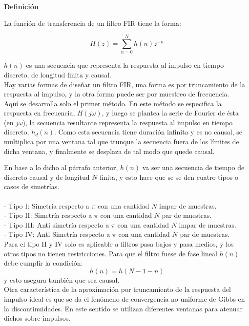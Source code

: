 \documentclass[informe.tex]{subfiles}
\begin{document}
\textbf{Definición}\newline

La función de transferencia de un filtro FIR tiene la forma:

$$
	H(z) = \sum_{n=0}^{N}{h(n)z^{-n}}
$$

$h(n)$ es una secuencia que representa la respuesta al impulso en tiempo discreto, de longitud finita y causal.\\

Hay varias formas de diseñar un filtro FIR, una forma es por truncamiento de la respuesta al impulso, y la otra forma puede ser por muestreo de frecuencia.\\

Aquí se desarrolla solo el primer método. En este método se especifica la respuesta en frecuencia, $H(j\omega)$, y luego se plantea la serie de Fourier de ésta (en $j\omega$), la secuencia resultante representa la respuesta al impulso en tiempo discreto, $h_d(n)$. Como esta secuencia tiene duración infinita y es no causal, se multiplica por una ventana tal que trunque la secuencia fuera de los límites de dicha ventana, y finalmente se desplaza de tal modo que quede causal.\newline

En base a lo dicho al párrafo anterior, $h(n)$ va ser una secuencia de tiempo de discreto causal y de longitud $N$ finita, y esto hace que se  se den cuatro tipos o casos de simetrías.\\\\
- Tipo I: Simetría respecto a $\pi$ con una cantidad $N$ impar de muestras.\\
- Tipo II: Simetría respecto a $\pi$ con una cantidad $N$ par de muestras.\\
- Tipo III: Anti simetría respecto a $\pi$ con una cantidad $N$ impar de muestras.\\
- Tipo IV: Anti Simetría respecto a $\pi$ con una cantidad $N$ par de muestras.\\

Para el tipo II y IV solo es aplicable a filtros pasa bajos y pasa medios, y los otros tipos no tienen restricciones. Para que el filtro fuese de fase lineal $h(n)$ debe cumplir la condición:
  $$ h(n) = h(N-1-n)$$
y esto asegura también que sea causal.\\

Otra característica de la aproximación por truncamiento de la respuesta del impulso ideal es que se da el fenómeno de convergencia no uniforme de Gibbs en la discontinuidades. En este sentido se utilizan diferentes ventanas para atenuar dichos sobre-impulsos.\\\\
\end{document}

